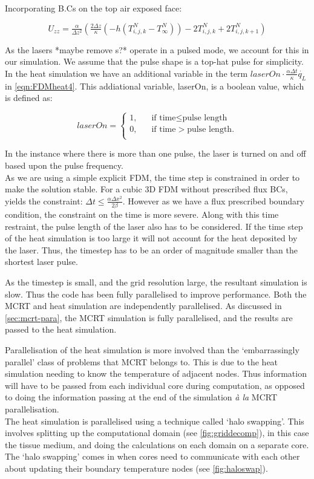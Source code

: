 Incorporating B.Cs on the top air exposed face:

\begin{equation}
U_{zz} = \tfrac{\alpha}{\Delta z^2} (\tfrac{2 \Delta z}{\kappa} (-h(T^N_{i,j,k}-T^N_\infty) ) -2 T^N_{i,j,k} + 2T^N_{i,j,k+1}) 
\end{equation}

As the lasers *maybe remove s?* operate in a pulsed mode, we account for this in our simulation. We assume that the pulse shape is a top-hat pulse for simplicity. In the heat simulation we have an additional variable in the term $laserOn\cdot\tfrac{\alpha \Delta t}{\kappa}\dot{q_L}$ in \cref{eqn:FDMheat4}. This addiational variable, laserOn, is a boolean value, which is defined as:

\[   
laserOn = 
     \begin{cases}
       \text{1,} &\quad\text{if time}\le\text{pulse length}\\
       \text{0,} &\quad\text{if time}>\text{pulse length}.\\
     \end{cases}
\]

In the instance where there is more than one pulse, the laser is turned on and off based upon the pulse frequency.\\

As we are using a simple explicit FDM, the time step is constrained in order to make the solution stable. For a cubic 3D FDM without prescribed flux BCs, yields the constraint: $\Delta t \leq \tfrac{\alpha \Delta x^2}{2\beta}$. However as we have a flux prescribed boundary condition, the constraint on the time is more severe. Along with this time restraint, the pulse length of the laser also has to be considered. If the time step of the heat simulation is too large it will not account for the heat deposited by the laser. Thus, the timestep has to be an order of magnitude smaller than the shortest laser pulse.

As the timestep is small, and the grid resolution large, the resultant simulation is slow. Thus the code has been fully parallelised to improve performance. Both the MCRT and heat simulation are independently parallelised. As discussed in \cref{sec:mcrt-para}, the MCRT simulation is fully parallelised, and the results are passed to the heat simulation.

Parallelisation of the heat simulation is more involved than the `embarrassingly parallel' class of problems that MCRT belongs to. This is due to the heat simulation needing to know the temperature of adjacent nodes. Thus information will have to be passed from each individual core during computation, as opposed to doing the information passing at the end of the simulation \textit{\`a la} MCRT parallelisation.\\
The heat simulation is parallelised using a technique called `halo swapping'. This involves splitting up the computational domain (see \cref{fig:griddecomp}), in this case the tissue medium, and doing the calculations on each domain on a separate core. The `halo swapping' comes in when cores need to communicate with each other about updating their boundary temperature nodes (see \cref{fig:haloswap}).\\

